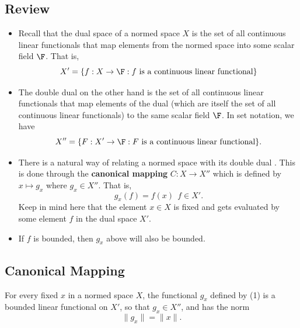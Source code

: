 \subsection{Review}
\begin{itemize}
    \item Recall that the dual space of a normed space \( X  \) is the set of all continuous linear functionals that map elements from the normed space into some scalar field \( \F  \). That is, 
        \[ X' = \{ f : X \to \F : \text{\( f \) is a continuous linear functional}  \}  \]
    \item The double dual on the other hand is the set of all continuous linear functionals that map elements of the dual (which are itself the set of all continuous linear functionals) to the same scalar field \( \F \). In set notation, we have
        \[  X'' = \{ F: X' \to \F : \text{\( F  \) is a continuous linear functional} \}.  \]
    \item There is a natural way of relating a normed space with its double dual . This is done through the \textbf{canonical mapping} \( C  : X \to X'' \) which is defined by \( x \mapsto g_x \) where \( {g}_{x} \in X'' \). That is,
        \[  {g}_{x}(f) = f(x)  \ \ f \in X'  . \tag{1}\]
        Keep in mind here that the element \( x \in X  \) is fixed and gets evaluated by some element \( f  \) in the dual space \( X' \).
    \item If \( f  \) is bounded, then \( {g}_{x} \) above will also be bounded.
\end{itemize} 

\subsection{Canonical Mapping}

\begin{lemma}[Norm of \( g_x \)]\label{4.6-2} 
   For every fixed \( x  \) in a normed space \( X  \), the functional \( {g}_{x}  \) defined by (1) is a bounded linear functional on \( X' \), so that \( {g}_{x} \in X'' \), and has the norm   
   \[  \|{g}_{x}\| = \|x\|. \]
\end{lemma}

